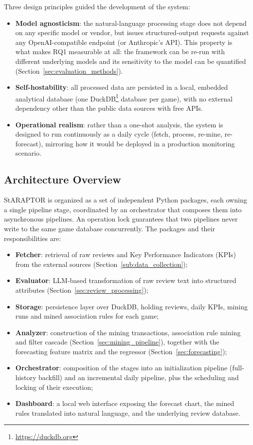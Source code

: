 Three design principles guided the development of the system:
\begin{itemize}
    \item \textbf{Model agnosticism}: the natural-language processing stage does not depend on any specific model or vendor, but issues structured-output requests against any OpenAI-compatible endpoint (or Anthropic's API). This property is what makes RQ1 measurable at all: the framework can be re-run with different underlying models and its sensitivity to the model can be quantified (Section~\ref{sec:evaluation_methods}).
    \item \textbf{Self-hostability}: all processed data are persisted in a local, embedded analytical database (one DuckDB\footnote{\url{https://duckdb.org}} database per game), with no external dependency other than the public data sources with free APIs.
    \item \textbf{Operational realism}: rather than a one-shot analysis, the system is designed to run continuously as a daily cycle (fetch, process, re-mine, re-forecast), mirroring how it would be deployed in a production monitoring scenario.
\end{itemize}

\subsection{Architecture Overview}
\label{sec:architecture}

\noindent StARAPTOR is organized as a set of independent Python packages, each owning a single pipeline stage, coordinated by an orchestrator that composes them into asynchronous pipelines. An operation lock guarantees that two pipelines never write to the same game database concurrently. The packages and their responsibilities are:

\begin{itemize}
    \item \textbf{Fetcher}: retrieval of raw reviews and Key Performance Indicators (KPIs) from the external sources (Section~\ref{sub:data_collection});
    \item \textbf{Evaluator}: LLM-based transformation of raw review text into structured attributes (Section~\ref{sec:review_processing});
    \item \textbf{Storage}: persistence layer over DuckDB, holding reviews, daily KPIs, mining runs and mined association rules for each game;
    \item \textbf{Analyzer}: construction of the mining transactions, association rule mining and filter cascade (Section~\ref{sec:mining_pipeline}), together with the forecasting feature matrix and the regressor (Section~\ref{sec:forecasting});
    \item \textbf{Orchestrator}: composition of the stages into an initialization pipeline (full-history backfill) and an incremental daily pipeline, plus the scheduling and locking of their execution;
    \item \textbf{Dashboard}: a local web interface exposing the forecast chart, the mined rules translated into natural language, and the underlying review database.
\end{itemize}

